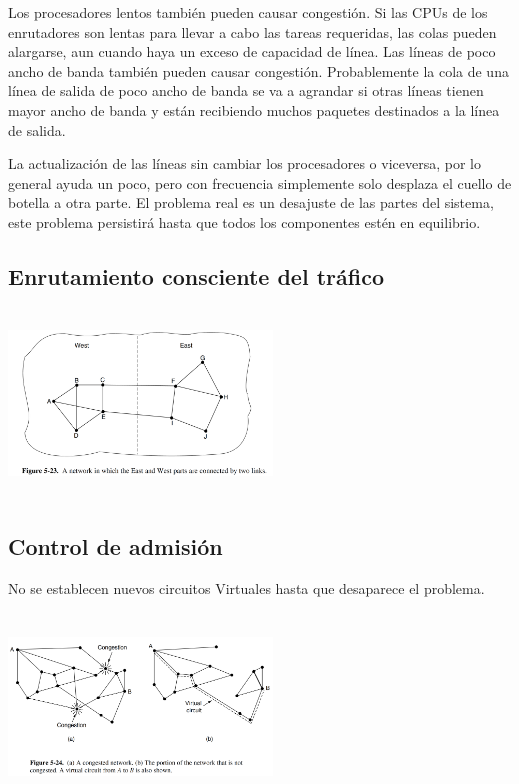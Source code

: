 	\par Los procesadores lentos también pueden causar congestión. Si las CPUs de los enrutadores son lentas para llevar a cabo las tareas requeridas, las colas pueden alargarse, aun cuando haya un exceso de capacidad de línea. Las líneas de poco ancho de banda también pueden causar congestión. Probablemente la cola de una línea de salida de poco ancho de banda se va a agrandar si otras líneas tienen mayor ancho de banda y están recibiendo muchos paquetes destinados a la línea de salida.

	\par La actualización de las líneas sin cambiar los procesadores o viceversa, por lo general ayuda un poco, pero con frecuencia simplemente solo desplaza el cuello de botella a otra parte. El problema real es un desajuste de las partes del sistema, este problema persistirá hasta que todos los componentes estén en equilibrio.

\subsection{Enrutamiento consciente del tráfico}

	\begin{center}
			\includegraphics[width=7cm, height=5cm]{./imagenes/consciente.png} 
	\end{center}

\subsection{Control de admisión}

	No se establecen nuevos circuitos Virtuales hasta que desaparece el problema.
	\begin{center}
			\includegraphics[width=7cm, height=5cm]{./imagenes/admision.png} 
	\end{center}

